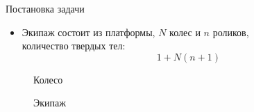 \begin{frame}{Постановка задачи}
    \begin{itemize}
    \item {
        Экипаж состоит из платформы, $N$ колес и $n$ роликов,\\
        количество твердых тел:
        $$1 + N(n+1)$$
    }
    \end{itemize}
    \begin{figure}
        \centering
            \caption{Колесо}
        \endminipage
        \qquad
            \caption{Экипаж}
        \endminipage
    \end{figure}
\end{frame}